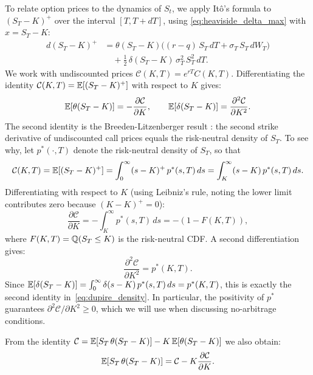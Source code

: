 To relate option prices to the dynamics of $S_t$, we apply It\^{o}'s formula
to $(S_T - K)^+$ over the interval $[T, T + dT]$, using \eqref{eq:heaviside_delta_max}
with $x = S_T - K$:
\begin{align*}
    d(S_T - K)^+
    &= \theta(S_T - K)\bigl((r-q)\,S_T\,dT + \sigma_T\,S_T\,dW_T\bigr) \\
    &\quad + \frac{1}{2}\,\delta(S_T - K)\,\sigma_T^2\,S_T^2\,dT.
\end{align*}
We work with undiscounted prices $\mathcal{C}(K,T) = e^{rT} C(K,T)$.
Differentiating the identity $\mathcal{C}(K,T) = \mathbb{E}[(S_T - K)^+]$ with respect to $K$ gives:
\begin{equation}\label{eq:dupire_density}
    \mathbb{E}\!\left[\theta(S_T - K)\right] = -\frac{\partial \mathcal{C}}{\partial K},
    \qquad
    \mathbb{E}\!\left[\delta(S_T - K)\right] = \frac{\partial^2 \mathcal{C}}{\partial K^2}.
\end{equation}
The second identity is the Breeden-Litzenberger result \cite{breeden_litzenberger}: the second strike derivative
of undiscounted call prices equals the risk-neutral density of $S_T$.
To see why, let $p^*(\cdot, T)$ denote the risk-neutral density of $S_T$, so that
\begin{equation*}
    \mathcal{C}(K, T)
        = \mathbb{E}[(S_T - K)^+]
        = \int_0^{\infty} (s - K)^+\, p^*(s, T)\,ds
        = \int_K^{\infty} (s - K)\, p^*(s, T)\,ds.
\end{equation*}
Differentiating with respect to $K$ (using Leibniz's rule, noting the lower limit contributes zero
because $(K-K)^+ = 0$):
\begin{equation*}
    \frac{\partial \mathcal{C}}{\partial K}
        = -\int_K^{\infty} p^*(s, T)\,ds
        = -(1 - F(K, T)),
\end{equation*}
where $F(K, T) = \mathbb{Q}(S_T \leq K)$ is the risk-neutral CDF.
A second differentiation gives:
\begin{equation}\label{eq:breeden_litzenberger}
    \frac{\partial^2 \mathcal{C}}{\partial K^2} = p^*(K, T).
\end{equation}
Since $\mathbb{E}[\delta(S_T - K)] = \int_0^\infty \delta(s - K)\,p^*(s,T)\,ds = p^*(K,T)$,
this is exactly the second identity in~\eqref{eq:dupire_density}.
In particular, the positivity of $p^*$ guarantees $\partial^2 \mathcal{C}/\partial K^2 \geq 0$,
which we will use when discussing no-arbitrage conditions.

From the identity $\mathcal{C} = \mathbb{E}[S_T\,\theta(S_T - K)] - K\,\mathbb{E}[\theta(S_T - K)]$ we also obtain:
\begin{equation*}
    \mathbb{E}\!\left[S_T\,\theta(S_T - K)\right] = \mathcal{C} - K\frac{\partial \mathcal{C}}{\partial K}.
\end{equation*}


